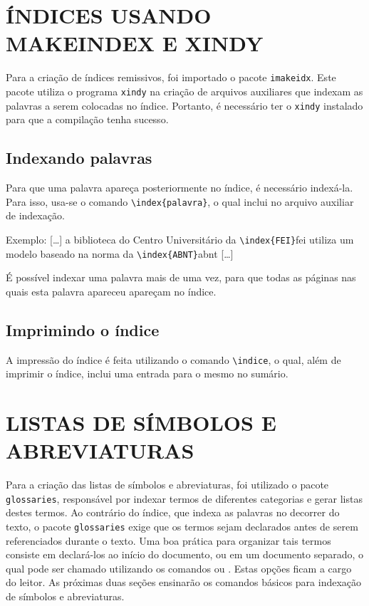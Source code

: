 \documentclass{fei}
\begin{document}
	\chapter{ÍNDICES USANDO MAKEINDEX E XINDY}\label{chap:indice}
	
	Para a criação de índices remissivos, foi importado o pacote \texttt{imakeidx}. Este pacote utiliza o programa \texttt{xindy} na criação de arquivos auxiliares que indexam as palavras a serem colocadas no índice. Portanto, é necessário ter o \texttt{xindy} instalado para que a compilação tenha sucesso.
	
	\section{Indexando palavras}
	
	Para que uma palavra apareça posteriormente no índice, é necessário indexá-la. Para isso, usa-se o comando \verb+\index{palavra}+, o qual inclui  no arquivo auxiliar de indexação.

	Exemplo: [\ldots] a biblioteca do Centro Universitário da \verb+\index{FEI}+\gls{fei} utiliza um modelo baseado na norma da \verb+\index{ABNT}+\gls{abnt} [\ldots]
	
	É possível indexar uma palavra mais de uma vez, para que todas as páginas nas quais esta palavra apareceu apareçam no índice.
	
	\section{Imprimindo o índice}

	A impressão do índice é feita utilizando o comando \verb+\indice+, o qual, além de imprimir o índice, inclui uma entrada para o mesmo no sumário.

	\chapter{LISTAS DE SÍMBOLOS E ABREVIATURAS} \label{chap:listas}
	
	Para a criação das listas de símbolos e abreviaturas, foi utilizado o pacote \verb+glossaries+, responsável por indexar termos de diferentes categorias e gerar listas destes termos. Ao contrário do índice, que indexa as palavras no decorrer do texto, o pacote \verb+glossaries+ exige que os termos sejam declarados antes de serem referenciados durante o texto. Uma boa prática para organizar tais termos consiste em declará-los ao início do documento, ou em um documento separado, o qual pode ser chamado utilizando os comandos \verb++ ou \verb++. Estas opções ficam a cargo do leitor. As próximas duas seções ensinarão os comandos básicos para indexação de símbolos e abreviaturas.
	
\end{document}
